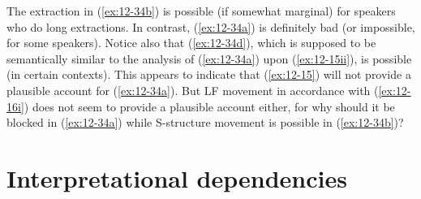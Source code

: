 \documentclass[output=paper]{langsci/langscibook}
\begin{document}
The extraction in (\ref{ex:12-34b}) is possible (if somewhat marginal) for speakers who
do long extractions. In contrast, (\ref{ex:12-34a}) is definitely bad (or impossible, for
some speakers). Notice also that (\ref{ex:12-34d}), which is supposed to be semantically
similar to the analysis of (\ref{ex:12-34a}) upon (\ref{ex:12-15ii}), is possible (in certain
contexts). This appears to indicate that (\ref{ex:12-15}) will not provide a plausible
account for (\ref{ex:12-34a}). But LF movement in accordance with (\ref{ex:12-16i}) does not seem to
provide a plausible account either, for why should it be blocked in (\ref{ex:12-34a})
while S-structure movement is possible in (\ref{ex:12-34b})?

\section{Interpretational dependencies}
\label{sec:12-8}
\end{document}
